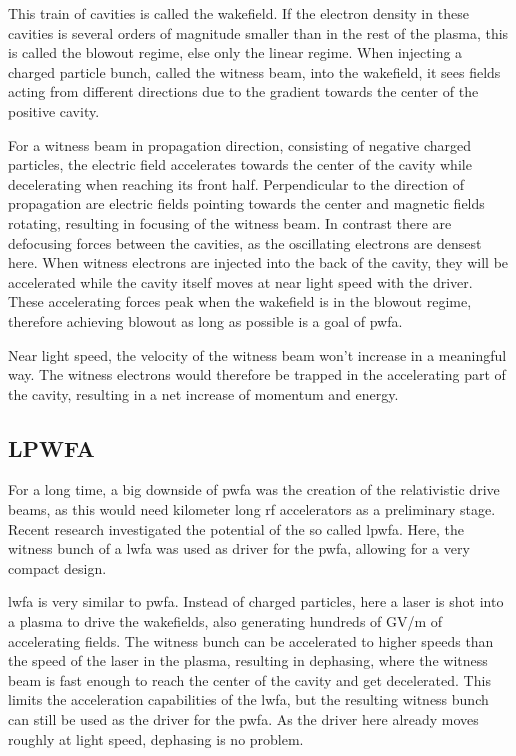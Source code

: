 \documentclass[bachelor_thesis]{subfiles}
\begin{document}
This train of cavities is called the wakefield. If the electron density in these cavities is several orders of magnitude smaller than in the rest of the plasma, this is called the blowout regime, else only the linear regime.
When injecting a charged particle bunch, called the witness beam, into the wakefield, it sees fields acting from different directions due to the gradient towards the center of the positive cavity. 

For a witness beam in propagation direction, consisting of negative charged particles, the electric field accelerates towards the center of the cavity while decelerating when reaching its front half. 
Perpendicular to the direction of propagation are electric fields pointing towards the center and magnetic fields rotating, resulting in focusing of the witness beam. In contrast there are defocusing forces between the cavities, as the oscillating electrons are densest here.
When witness electrons are injected into the back of the cavity, they will be accelerated while the cavity itself moves at near light speed with the driver.
These accelerating forces peak when the wakefield is in the blowout regime, therefore achieving blowout as long as possible is a goal of \gls{pwfa}.

Near light speed, the velocity of the witness beam won't increase in a meaningful way. The witness electrons would therefore be trapped in the accelerating part of the cavity, resulting in a net increase of momentum and energy.

\subsection{LPWFA} \label{chap:lpfwa}
For a long time, a big downside of \gls{pwfa} was the creation of the relativistic drive beams, as this would need kilometer long \gls{rf} accelerators as a preliminary stage. Recent research \cite{Kurz2021} investigated the potential of the so called \gls{lpwfa}.
Here, the witness bunch of a \gls{lwfa} was used as driver for the \gls{pwfa}, allowing for a very compact design.

\Gls{lwfa} is very similar to \gls{pwfa}. Instead of charged particles, here a laser is shot into a plasma to drive the wakefields, also generating hundreds of \unit{\giga\volt/\m} of accelerating fields.
The witness bunch can be accelerated to higher speeds than the speed of the laser in the plasma, resulting in dephasing, where the witness beam is fast enough to reach the center of the cavity and get decelerated. This limits the acceleration capabilities of the \gls{lwfa},
 but the resulting witness bunch can still be used as the driver for the \gls{pwfa}. As the driver here already moves roughly at light speed, dephasing is no problem. 
\end{document}
